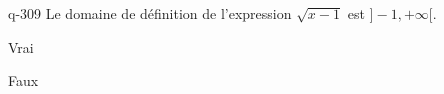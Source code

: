 \begin{truefalse}{q-309}
Le domaine de définition de l'expression $\sqrt{x-1}$ est $]-1,+\infty[$.
\item Vrai
\item* Faux
\end{truefalse}

